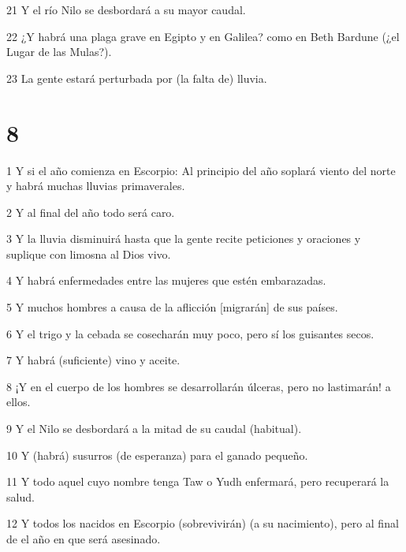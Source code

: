 \par 21 Y el río Nilo se desbordará a su mayor caudal.

\par 22 ¿Y habrá una plaga grave en Egipto y en Galilea? como en Beth Bardune (¿el Lugar de las Mulas?).

\par 23 La gente estará perturbada por (la falta de) lluvia.

\chapter{8}

\par 1 Y si el año comienza en Escorpio: Al principio del año soplará viento del norte y habrá muchas lluvias primaverales.

\par 2 Y al final del año todo será caro.

\par 3 Y la lluvia disminuirá hasta que la gente recite peticiones y oraciones y suplique con limosna al Dios vivo.

\par 4 Y habrá enfermedades entre las mujeres que estén embarazadas.

\par 5 Y muchos hombres a causa de la aflicción [migrarán] de sus países.

\par 6 Y el trigo y la cebada se cosecharán muy poco, pero sí los guisantes secos.

\par 7 Y habrá (suficiente) vino y aceite.

\par 8 ¡Y en el cuerpo de los hombres se desarrollarán úlceras, pero no lastimarán! a ellos.

\par 9 Y el Nilo se desbordará a la mitad de su caudal (habitual).

\par 10 Y (habrá) susurros (de esperanza) para el ganado pequeño.

\par 11 Y todo aquel cuyo nombre tenga Taw o Yudh enfermará, pero recuperará la salud.

\par 12 Y todos los nacidos en Escorpio (sobrevivirán) (a su nacimiento), pero al final de el año en que será asesinado.

